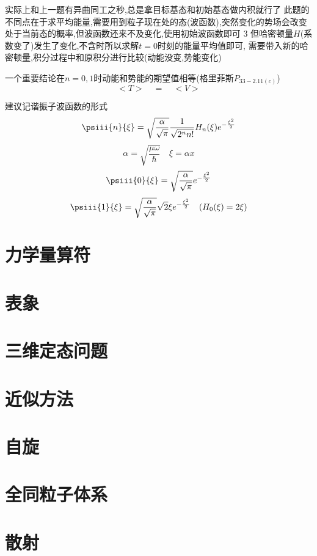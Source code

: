             实际上和上一题有异曲同工之秒,总是拿目标基态和初始基态做内积就行了
            此题的不同点在于求平均能量,需要用到粒子现在处的态(波函数),突然变化的势场会改变处于当前态的概率,但波函数还来不及变化,使用初始波函数即可
            3
            但哈密顿量$H$(系数变了)发生了变化,不含时所以求解$t=0$时刻的能量平均值即可,
            需要带入新的哈密顿量,积分过程中和原积分进行比较(动能没变,势能变化)
            
            一个重要结论在$n=0,1$时动能和势能的期望值相等(格里菲斯$P_{33-2.11(c)}$)
            $$ <T> \quad = \quad  <V> $$

            建议记谐振子波函数的形式
            $$ \psiii{n}{\xi} = \sqrt{\frac{\alpha}{\sqrt{\pi}}} \frac{1}{\sqrt{2^{n} n!}} H_{n}(\xi) e^{-\frac{\xi^{2}}{2}} $$
            $$ \alpha = \sqrt{\frac{\mu \omega}{\hbar}} \quad \xi = \alpha x $$
            $$ \psiii{0}{\xi} = \sqrt{\frac{\alpha}{\sqrt{\pi}}} e^{-\frac{\xi^{2}}{2}} $$
            $$ \psiii{1}{\xi} = \sqrt{\frac{\alpha}{\sqrt{\pi}}} \sqrt{2} \xi e^{-\frac{\xi^{2}}{2}} \quad (H_{0}(\xi) = 2\xi) $$
            
            
        
        
            
                



                
            
        
        
            

            
        
        
        
        
    
        
    
    
    

      

    \section{力学量算符}


    \section{表象}


    \section{三维定态问题}

    \section{近似方法}

    \section{自旋}

    \section{全同粒子体系}

    \section{散射}
    
    


  

